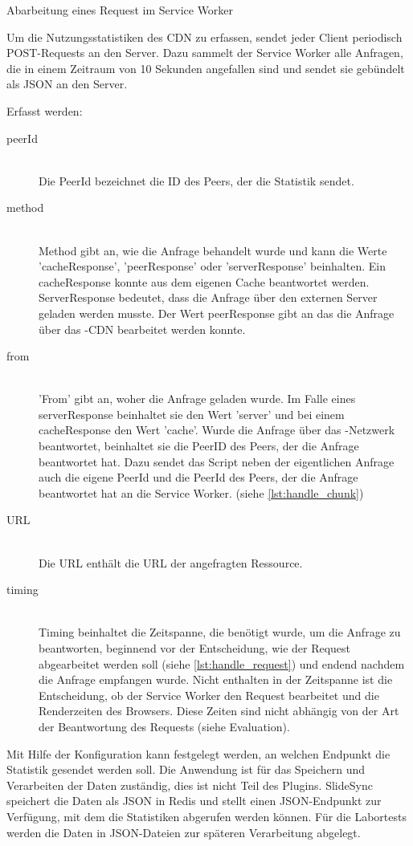 \begin{description}
\begin{listing}[h]
	\inputminted{javascript}{listings/handle_request.js}
	\caption{Abarbeitung eines Request im Service Worker}
	\label{lst:handle_request}
\end{listing}

Um die Nutzungsstatistiken des CDN zu erfassen, sendet jeder Client periodisch POST-Requests an den Server. Dazu sammelt der Service Worker alle Anfragen, die in einem Zeitraum von 10 Sekunden angefallen sind und sendet sie gebündelt als JSON an den Server.

Erfasst werden:
\begin{description}
\item[peerId]\hfill \\
Die PeerId bezeichnet die ID des Peers, der die Statistik sendet.
\item[method]\hfill \\
Method gibt an, wie die Anfrage behandelt wurde und kann die Werte 'cacheResponse', 'peerResponse' oder 'serverResponse' beinhalten. Ein cacheResponse konnte aus dem eigenen Cache beantwortet werden. ServerResponse bedeutet, dass die Anfrage über den externen Server geladen werden musste. Der Wert peerResponse gibt an das die Anfrage über das \pTp-CDN bearbeitet werden konnte.
\item[from]\hfill \\
 'From' gibt an, woher die Anfrage geladen wurde. Im Falle eines serverResponse beinhaltet sie den Wert 'server' und bei einem cacheResponse den Wert 'cache'. Wurde die Anfrage über das \pTp-Netzwerk beantwortet, beinhaltet sie die PeerID des Peers, der die Anfrage beantwortet hat. Dazu sendet das Script neben der eigentlichen Anfrage auch die eigene PeerId und die PeerId des Peers, der die Anfrage beantwortet hat an die Service Worker. (siehe \ref{lst:handle_chunk}) 
\item[URL]\hfill \\
Die URL enthält die URL der angefragten Ressource. 
\item[timing]\hfill \\
Timing beinhaltet die Zeitspanne, die benötigt wurde, um die Anfrage zu beantworten, beginnend vor der Entscheidung, wie der Request abgearbeitet werden soll (siehe \ref{lst:handle_request}) und endend nachdem die Anfrage empfangen wurde. Nicht enthalten in der Zeitspanne ist die Entscheidung, ob der Service Worker den Request bearbeitet und die Renderzeiten des Browsers. Diese Zeiten sind nicht abhängig von der Art der Beantwortung des Requests (siehe Evaluation).
\end{description}
Mit Hilfe der Konfiguration kann festgelegt werden, an welchen Endpunkt die Statistik gesendet werden soll. Die Anwendung ist für das Speichern und Verarbeiten der Daten zuständig, dies ist nicht Teil des Plugins. SlideSync speichert die Daten als JSON in Redis und stellt einen JSON-Endpunkt zur Verfügung, mit dem die Statistiken abgerufen werden können. Für die Labortests werden die Daten in JSON-Dateien zur späteren Verarbeitung abgelegt.



\end{description}
